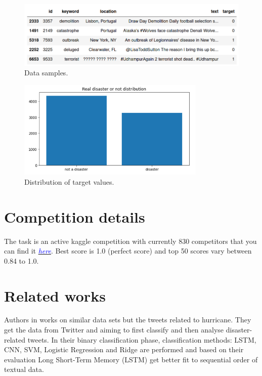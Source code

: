 \documentclass[12pt]{extarticle}
\begin{document}
\begin{figure}[!t]
\centering
\includegraphics[width=1\textwidth]{images/dataSamples.png}
\caption{Data samples.}
\label{fig:dataSamples}
\end{figure}

\begin{figure}[!t]
\centering
\includegraphics[width=0.8\textwidth]{images/distribution.png}
\caption{Distribution of target values.}
\label{fig:targetdist}
\end{figure}


\section*{Competition details}

The task is an active kaggle competition with currently 830 competitors that you can find it \href{https://www.kaggle.com/c/nlp-getting-started/}{\textcolor{blue}{\textit{here}}}. Best score is 1.0 (perfect score) and top 50 scores vary between 0.84 to 1.0.\\

\section*{Related works}
 
 Authors in \cite{sit2019identifying} works on similar data sets but the tweets related to hurricane. They get the data from Twitter and aiming to first classify and then analyse disaster-related tweets. In their binary classification phase, classification methods: LSTM, CNN, SVM, Logistic Regression and Ridge are performed and based on their evaluation Long Short-Term Memory (LSTM) get better fit to sequential order of textual data.
 
\end{document}
